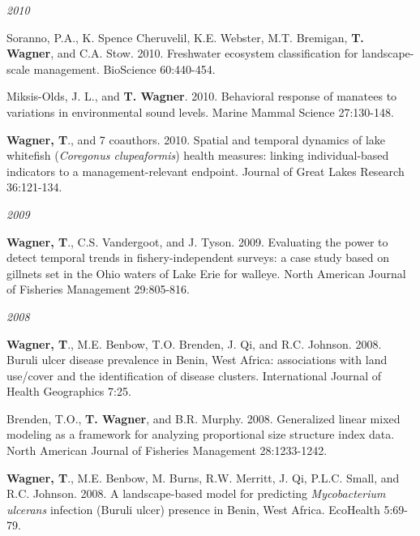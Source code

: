 \documentclass[10pt]{article}
\begin{document}
\begin{flushleft}
\begin{etaremune}[start=22]
\end{etaremune}
\emph{2010}
\begin{etaremune}[start=18]
\item Soranno, P.A., K. Spence Cheruvelil, K.E. Webster, M.T. Bremigan, {\bf T. Wagner}, and C.A. Stow. 2010. Freshwater ecosystem classification for landscape-scale management. BioScience 60:440-454.

\item Miksis-Olds, J. L., and {\bf T. Wagner}. 2010. Behavioral response of manatees to variations in environmental sound levels. Marine Mammal Science 27:130-148.

\item {\bf Wagner, T}., and 7 coauthors. 2010. Spatial and temporal dynamics of lake whitefish (\emph{Coregonus clupeaformis}) health measures: linking individual-based indicators to a management-relevant endpoint. Journal of Great Lakes Research 36:121-134.

\end{etaremune}
\emph{2009}
\begin{etaremune}[start=15]
\item {\bf Wagner, T}., C.S. Vandergoot, and J. Tyson. 2009. Evaluating the power to detect temporal trends in fishery-independent surveys: a case study based on gillnets set in the Ohio waters of Lake Erie for walleye. North American Journal of Fisheries Management 29:805-816.

\end{etaremune}
\emph{2008}
\begin{etaremune}[start=14]
\item {\bf Wagner, T}., M.E. Benbow, T.O. Brenden, J. Qi, and R.C. Johnson. 2008. Buruli ulcer disease prevalence in Benin, West Africa: associations with land use/cover and the identification of disease clusters. International Journal of Health Geographics 7:25.

\item Brenden, T.O., {\bf T. Wagner}, and B.R. Murphy. 2008. Generalized linear mixed modeling as a framework for analyzing proportional size structure index data. North American Journal of Fisheries Management 28:1233-1242.

\item {\bf Wagner, T}., M.E. Benbow, M. Burns, R.W. Merritt, J. Qi, P.L.C. Small, and R.C. Johnson. 2008. A landscape-based model for predicting \emph{Mycobacterium ulcerans} infection (Buruli ulcer) presence in Benin, West Africa. EcoHealth 5:69-79.


\end{etaremune}
\end{flushleft}
\end{document}
